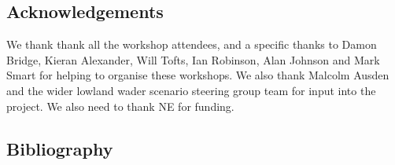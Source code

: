\documentclass[
  12pt,
  letterpaper,
  DIV=11,
  numbers=noendperiod]{scrartcl}
\begin{document}
\newpage{}

\subsection{Acknowledgements}\label{acknowledgements}

We thank thank all the workshop attendees, and a specific thanks to
Damon Bridge, Kieran Alexander, Will Tofts, Ian Robinson, Alan Johnson
and Mark Smart for helping to organise these workshops. We also thank
Malcolm Ausden and the wider lowland wader scenario steering group team
for input into the project. We also need to thank NE for funding.

\newpage{}

\subsection*{Bibliography}\label{bibliography}
\end{document}
